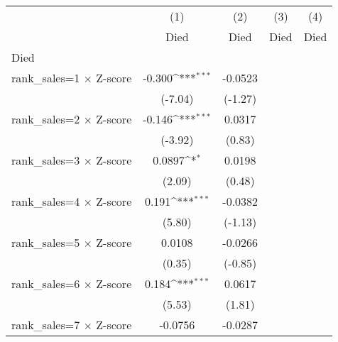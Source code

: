 {
\def\sym#1{\ifmmode^{#1}\else\(^{#1}\)\fi}
\begin{tabular}{l*{4}{c}}
\hline\hline
                    &\multicolumn{1}{c}{(1)}&\multicolumn{1}{c}{(2)}&\multicolumn{1}{c}{(3)}&\multicolumn{1}{c}{(4)}\\
                    &\multicolumn{1}{c}{Died}&\multicolumn{1}{c}{Died}&\multicolumn{1}{c}{Died}&\multicolumn{1}{c}{Died}\\
\hline
Died                &                     &                     &                     &                     \\
rank\_sales=1 $\times$ Z-score&      -0.300\sym{***}&     -0.0523         &                     &                     \\
                    &     (-7.04)         &     (-1.27)         &                     &                     \\
rank\_sales=2 $\times$ Z-score&      -0.146\sym{***}&      0.0317         &                     &                     \\
                    &     (-3.92)         &      (0.83)         &                     &                     \\
rank\_sales=3 $\times$ Z-score&      0.0897\sym{*}  &      0.0198         &                     &                     \\
                    &      (2.09)         &      (0.48)         &                     &                     \\
rank\_sales=4 $\times$ Z-score&       0.191\sym{***}&     -0.0382         &                     &                     \\
                    &      (5.80)         &     (-1.13)         &                     &                     \\
rank\_sales=5 $\times$ Z-score&      0.0108         &     -0.0266         &                     &                     \\
                    &      (0.35)         &     (-0.85)         &                     &                     \\
rank\_sales=6 $\times$ Z-score&       0.184\sym{***}&      0.0617         &                     &                     \\
                    &      (5.53)         &      (1.81)         &                     &                     \\
rank\_sales=7 $\times$ Z-score&     -0.0756         &     -0.0287         &                     &                     \\

\end{tabular}}
